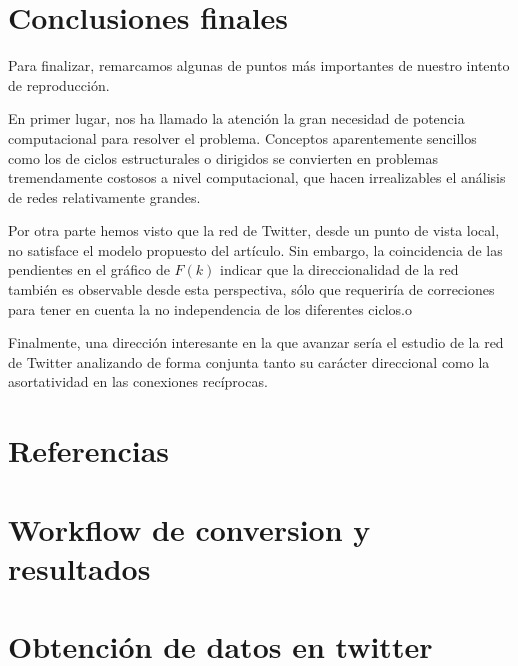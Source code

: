 \documentclass[1p]{elsarticle}
\begin{document}
\section{Conclusiones finales}
    Para finalizar, remarcamos algunas de puntos más importantes de nuestro intento de reproducción.

    En primer lugar, nos ha llamado la atención la gran necesidad de potencia computacional para resolver el problema. 
    Conceptos aparentemente sencillos como los de ciclos estructurales o dirigidos se convierten en problemas tremendamente costosos a nivel computacional, que hacen irrealizables el análisis de redes relativamente grandes.

    Por otra parte hemos visto que la red de Twitter, desde un punto de vista local, no satisface el modelo propuesto del artículo. Sin embargo, la coincidencia de las pendientes en el gráfico de $F(k)$ indicar que la direccionalidad de la red también es observable desde esta perspectiva, sólo que requeriría de correciones para tener en cuenta la no independencia de los diferentes ciclos.o

    Finalmente, una dirección interesante en la que avanzar sería el estudio de la red de Twitter analizando de forma conjunta tanto su carácter direccional como la asortatividad en las conexiones recíprocas.

\section*{Referencias}


\begin{appendices}
	
	\section{Workflow de conversion y resultados}
	
\pagebreak
\section{Obtención de datos en twitter}

\end{appendices}
\end{document}
